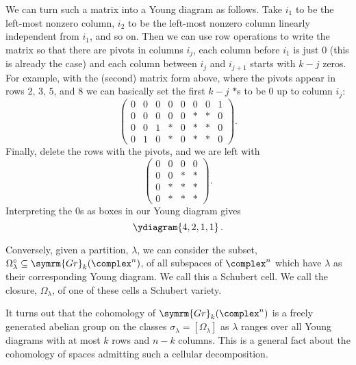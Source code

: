 \documentclass[fleqn]{NotesClass}
\newcommand{\Gr}{\symrm{Gr}}
\begin{document}
    We can turn such a matrix into a Young diagram as follows.
    Take \(i_1\) to be the left-most nonzero column, \(i_2\) to be the left-most nonzero column linearly independent from \(i_1\), and so on.
    Then we can use row operations to write the matrix so that there are pivots in columns \(i_j\), each column before \(i_1\) is just \(0\) (this is already the case) and each column between \(i_j\) and \(i_{j+1}\) starts with \(k - j\) zeros.
    For example, with the (second) matrix form above, where the pivots appear in rows \(2\), \(3\), \(5\), and \(8\) we can basically set the first \(k - j\) \(*\)s to be \(0\) up to column \(i_j\):
    \begin{equation}
        \begin{pmatrix}
            0 & 0 & 0 & 0 & 0 & 0 & 0 & 1\\
            0 & 0 & 0 & 0 & 0 & * & * & 0\\
            0 & 0 & 1 & * & 0 & * & * & 0\\
            0 & 1 & 0 & * & 0 & * & * & 0
        \end{pmatrix}
        .
    \end{equation}
    Finally, delete the rows with the pivots, and we are left with
    \begin{equation}
        \begin{pmatrix}
            0 & 0 & 0 & 0\\
            0 & 0 & * & *\\
            0 & * & * & *\\
            0 & * & * & *
        \end{pmatrix}
        .
    \end{equation}
    Interpreting the \(0\)s as boxes in our Young diagram gives
    \begin{equation}
        \ydiagram{4,2,1,1}\,.
    \end{equation}
    
    Conversely, given a partition, \(\lambda\), we can consider the subset, \(\Omega_\lambda^{\circ} \subseteq \Gr_k(\complex^n)\), of all subspaces of \(\complex^n\) which have \(\lambda\) as their corresponding Young diagram.
    We call this a Schubert cell.
    We call the closure, \(\Omega_\lambda\), of one of these cells a Schubert variety.
    
    It turns out that the cohomology of \(\Gr_k(\complex^n)\) is a freely generated abelian group on the classes \(\sigma_\lambda = [\Omega_\lambda]\) as \(\lambda\) ranges over all Young diagrams with at most \(k\) rows and \(n - k\) columns.
    This is a general fact about the cohomology of spaces admitting such a cellular decomposition.
    
\end{document}
